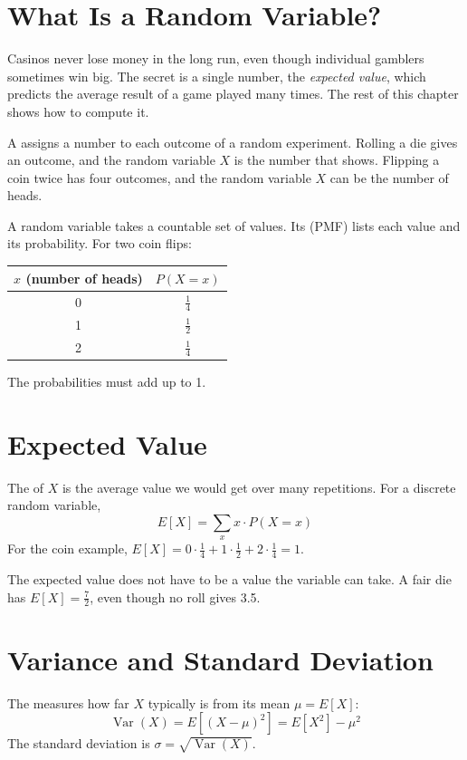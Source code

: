 
\section{What Is a Random Variable?}
Casinos never lose money in the long run, even though individual
gamblers sometimes win big. The secret is a single number, the
\emph{expected value}, which predicts the average result of a game played
many times. The rest of this chapter shows how to compute it.

A  assigns a number to each
outcome of a random experiment. Rolling a die gives an outcome, and the random
variable $X$ is the number that shows. Flipping a coin twice has four outcomes, and
the random variable $X$ can be the number of heads.

A  random variable takes a countable set of values. Its
 (PMF) lists
each value and its probability. For two coin flips:

\begin{center}
\begin{tabular}{|c|c|}
\hline
$x$ (number of heads) & $P(X = x)$ \\
\hline
0 & $\frac{1}{4}$ \\
\hline
1 & $\frac{1}{2}$ \\
\hline
2 & $\frac{1}{4}$ \\
\hline
\end{tabular}
\end{center}

The probabilities must add up to 1.

\section{Expected Value}
The  of $X$ is the average value we would get over many
repetitions. For a discrete random variable,
$$E[X] = \sum_x x \cdot P(X = x)$$
For the coin example, $E[X] = 0 \cdot \frac{1}{4} + 1 \cdot \frac{1}{2} + 2 \cdot
\frac{1}{4} = 1$.

The expected value does not have to be a value the variable can take. A fair
die has $E[X] = \frac{7}{2}$, even though no roll gives 3.5.

\section{Variance and Standard Deviation}
The  measures how far $X$ typically is from its mean $\mu = E[X]$:
$$\operatorname{Var}(X) = E[(X - \mu)^2] = E[X^2] - \mu^2$$
The standard deviation is $\sigma = \sqrt{\operatorname{Var}(X)}$.

